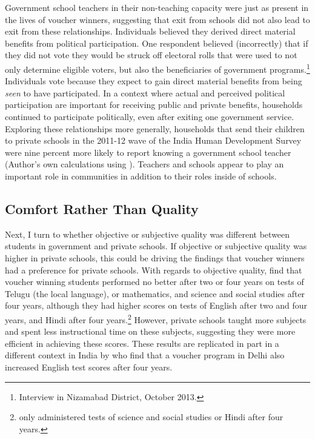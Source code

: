 \documentclass[hidelinks, 12pt, titlepage]{article}
\begin{document}
		Government school teachers in their non-teaching capacity were just as present in the lives of voucher winners, suggesting that exit from schools did not also lead to exit from these relationships.  Individuals believed they derived direct material benefits from political participation.  One respondent believed (incorrectly) that if they did not vote they would be struck off electoral rolls that were used to not only determine eligible voters, but also the beneficiaries of government programs.\footnote{Interview in Nizamabad District, October 2013.}  Individuals vote because they expect to gain direct material benefits from being \emph{seen} to have participated.  In a context where actual and perceived political participation are important for receiving public and private benefits, households continued to participate politically, even after exiting one government service. Exploring these relationships more generally, households that send their children to private schools in the 2011-12 wave of the India Human Development Survey were nine percent more likely to report knowing a government school teacher (Author's own calculations using \citep{Desai2018}).  Teachers and schools appear to play an important role in communities in addition to their roles inside of schools.

	\subsection*{Comfort Rather Than Quality}

		Next, I turn to whether objective or subjective quality was different between students in government and private schools.  If objective or subjective quality was higher in private schools, this could be driving the findings that voucher winners had a preference for private schools.  With regards to objective quality, \cite{Muralidharan2015} find that voucher winning students performed no better after two or four years on tests of Telugu (the local language), or mathematics, and science and social studies after four years, although they had higher scores on tests of English after two and four years, and Hindi after four years.\footnote{\cite{Muralidharan2015} only administered tests of science and social studies or Hindi after four years.}  However, private schools taught more subjects and spent less instructional time on these subjects, suggesting they were more efficient in achieving these scores.  These results are replicated in part in a different context in India by \cite{Dixon2019} who find that a voucher program in Delhi also increased English test scores after four years.
\end{document}
